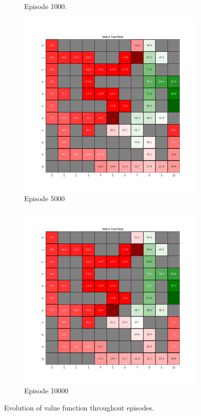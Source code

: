 \documentclass{assignment}
\begin{document}
\begin{figure}[H]
\begin{subfigure}{0.3\textwidth}
    \caption{Episode 1000.}
    \end{subfigure}\hfill
    \begin{subfigure}{0.3\textwidth}
        \includegraphics[width=\textwidth]{figures/value_q/alpha_sweep/value_function_alpha_0.5_gamma_0.95_epsilon_0.2_iteration_5000.png}
    \caption{Episode 5000}
    \end{subfigure}\hfill
    \begin{subfigure}{0.3\textwidth}
        \includegraphics[width=\textwidth]{figures/value_q/alpha_sweep/value_function_alpha_0.5_gamma_0.95_epsilon_0.2_iteration_10000.png}
    \caption{Episode 10000}
    \end{subfigure}
    \caption{Evolution of value function throughout episodes.}
    \label{fig:alpha_0.5_q_learning_value}
\end{figure}
\end{document}
